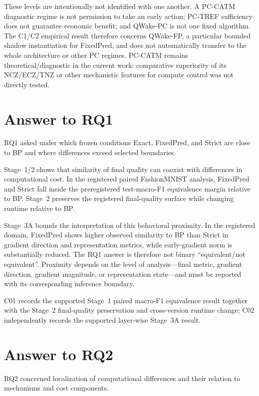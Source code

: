 These levels are intentionally not identified with one another. A PC-CATM diagnostic
regime is not permission to take an early action; PC-TREF sufficiency does not guarantee
economic benefit; and QWake-PC is not one fixed algorithm. The C1/C2 empirical result
therefore concerns QWake-FP, a particular bounded shadow instantiation for FixedPred,
and does not automatically transfer to the whole architecture or other PC regimes.
PC-CATM remains theoretical/diagnostic in the current work: comparative superiority of
its NCZ/ECZ/TNZ or other mechanistic features for compute control was not directly
tested.

\section{Answer to RQ1}
\label{sec:conclusion-rq1-en}

RQ1 asked under which frozen conditions Exact, FixedPred, and Strict are close to BP
and where differences exceed selected boundaries.

Stage~1/2 shows that similarity of final quality can coexist with differences in
computational cost. In the registered paired FashionMNIST analysis, FixedPred and
Strict fall inside the preregistered test-macro-F1 equivalence margin relative to BP.
Stage~2 preserves the registered final-quality surface while changing runtime relative
to BP.

Stage~3A bounds the interpretation of this behavioral proximity. In the registered
domain, FixedPred shows higher observed similarity to BP than Strict in gradient
direction and representation metrics, while early-gradient norm is substantially
reduced. The RQ1 answer is therefore not binary ``equivalent/not equivalent''.
Proximity depends on the level of analysis---final metric, gradient direction, gradient
magnitude, or representation state---and must be reported with its corresponding
inference boundary.

C01 records the supported Stage~1 paired macro-F1 equivalence result together with the
Stage~2 final-quality preservation and cross-version runtime change; C02 independently
records the supported layer-wise Stage~3A result.

\section{Answer to RQ2}
\label{sec:conclusion-rq2-en}

RQ2 concerned localization of computational differences and their relation to
mechanisms and cost components.

